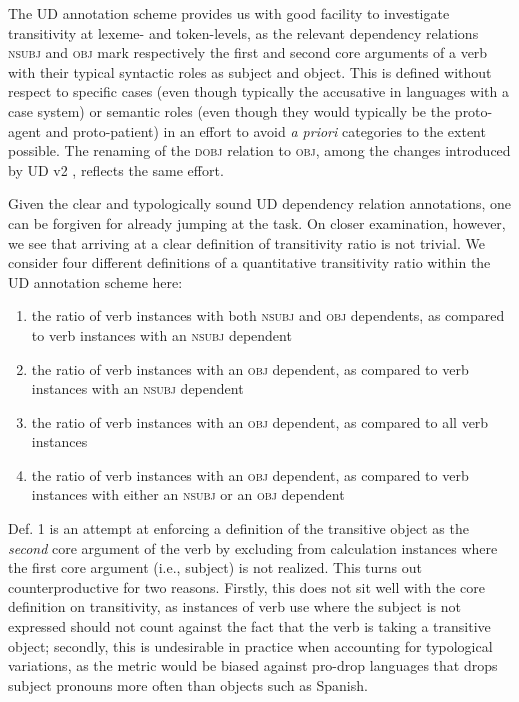 The UD annotation scheme provides us with good facility to investigate transitivity at lexeme- and token-levels, as the relevant dependency relations \textsc{nsubj} and \textsc{obj} mark respectively the first and second core arguments of a verb with their typical syntactic roles as subject and object. This is defined without respect to specific cases (even though typically the accusative in languages with a case system) or semantic roles (even though they would typically be the proto-agent and proto-patient) in an effort to avoid \textit{a priori} categories to the extent possible. The renaming of the \textsc{dobj} relation to \textsc{obj}, among the changes introduced by UD v2 \citep{nivre2020}, reflects the same effort.

Given the clear and typologically sound UD dependency relation annotations, one can be forgiven for already jumping at the task. On closer examination, however, we see that arriving at a clear definition of transitivity ratio is not trivial. We consider four different definitions of a quantitative transitivity ratio within the UD annotation scheme here:

\begin{enumerate}
    \item the ratio of verb instances with both \textsc{nsubj} and \textsc{obj} dependents, as compared to verb instances with an \textsc{nsubj} dependent
    \item the ratio of verb instances with an \textsc{obj} dependent, as compared to verb instances with an \textsc{nsubj} dependent
    \item the ratio of verb instances with an \textsc{obj} dependent, as compared to all verb instances
    \item the ratio of verb instances with an \textsc{obj} dependent, as compared to verb instances with either an \textsc{nsubj} or an \textsc{obj} dependent
\end{enumerate}

Def. 1 is an attempt at enforcing a definition of the transitive object as the \textit{second} core argument of the verb by excluding from calculation instances where the first core argument (i.e., subject) is not realized. This turns out counterproductive for two reasons. Firstly, this does not sit well with the core definition on transitivity, as instances of verb use where the subject is not expressed should not count against the fact that the verb is taking a transitive object; secondly, this is undesirable in practice when accounting for typological variations, as the metric would be biased against pro-drop languages that drops subject pronouns more often than objects such as Spanish.

